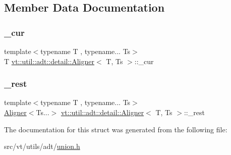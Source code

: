 \subsection{Member Data Documentation}
\mbox{\label{structvt_1_1util_1_1adt_1_1detail_1_1_aligner_aafdf38bb15e0136c6c529108f28c2dee}} 
\subsubsection{\texorpdfstring{\+\_\+cur}{\_cur}}
{\footnotesize\ttfamily template$<$typename T , typename... Ts$>$ \\
T \hyperlink{structvt_1_1util_1_1adt_1_1detail_1_1_aligner}{vt\+::util\+::adt\+::detail\+::\+Aligner}$<$ T, Ts $>$\+::\+\_\+cur}

\mbox{\label{structvt_1_1util_1_1adt_1_1detail_1_1_aligner_a4115223efc04e8781590dea362fc36f0}} 
\subsubsection{\texorpdfstring{\+\_\+rest}{\_rest}}
{\footnotesize\ttfamily template$<$typename T , typename... Ts$>$ \\
\hyperlink{structvt_1_1util_1_1adt_1_1detail_1_1_aligner}{Aligner}$<$Ts...$>$ \hyperlink{structvt_1_1util_1_1adt_1_1detail_1_1_aligner}{vt\+::util\+::adt\+::detail\+::\+Aligner}$<$ T, Ts $>$\+::\+\_\+rest}



The documentation for this struct was generated from the following file\+:\begin{DoxyCompactItemize}
\item 
src/vt/utils/adt/\hyperlink{union_8h}{union.\+h}\end{DoxyCompactItemize}
